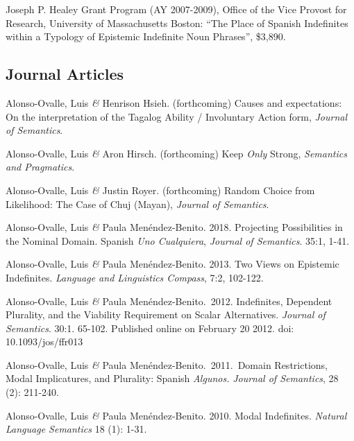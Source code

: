\documentclass[11pt]{article}
\begin{document}
Joseph P. Healey Grant Program (AY 2007-2009), Office of the Vice Provost for Research, University of Massachusetts Boston: ``The Place of Spanish Indefinites within a Typology of Epistemic Indefinite Noun Phrases'', \$3,890.


\subsection*{Journal Articles}

Alonso-Ovalle, Luis \textit{\&} Henrison Hsieh. (forthcoming) Causes and expectations: On the interpretation of the Tagalog Ability / Involuntary Action form, \textit{Journal of Semantics}.

Alonso-Ovalle, Luis \textit{\&} Aron Hirsch. (forthcoming) Keep \textit{Only} Strong, \textit{Semantics and Pragmatics}.

Alonso-Ovalle, Luis \textit{\&} Justin Royer. (forthcoming) Random Choice from Likelihood: The Case of Chuj (Mayan), \textit{Journal of Semantics}.


Alonso-Ovalle, Luis \textit{\&} Paula Men\'endez-Benito. 2018. Projecting Possibilities in the Nominal Domain. Spanish \textit{Uno Cualquiera}, \textit{Journal of Semantics}. 35:1, 1-41.


Alonso-Ovalle, Luis \textit{\&} Paula
    Men\'endez-Benito. 2013. Two Views on Epistemic
    Indefinites. \textit{Language and Linguistics Compass}, 7:2, 102-122. 

Alonso-Ovalle, Luis \textit{\&} Paula
    Men\'endez-Benito.\ 2012. Indefinites, Dependent Plurality, and
    the Viability Requirement on Scalar Alternatives. \textit{Journal
      of Semantics}. 30:1. 65-102. Published online on February 20 2012. doi: 10.1093/jos/ffr013

Alonso-Ovalle, Luis \textit{\&} Paula
    Men\'endez-Benito.\ 2011.\ Domain Restrictions, Modal
    Implicatures, and Plurality: Spanish \textit{Algunos.}
    \textit{Journal of Semantics}, 28 (2): 211-240.


Alonso-Ovalle, Luis \textit{\&} Paula
    Men\'endez-Benito. 2010. Modal Indefinites. \textit{Natural
      Language Semantics} 18 (1): 1-31. 
\end{document}
